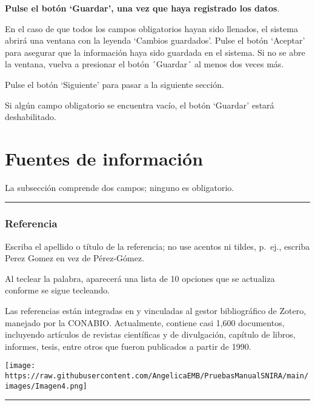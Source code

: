 \documentclass[
]{book}
\begin{document}
\textbf{Pulse el botón `Guardar', una vez que haya registrado los datos}.

En el caso de que todos los campos obligatorios hayan sido llenados, el sistema abrirá una ventana con la leyenda `Cambios guardados'. Pulse el botón `Aceptar' para asegurar que la información haya sido guardada en el sistema. Si no se abre la ventana, vuelva a presionar el botón ´Guardar´ al menos dos veces más.

Pulse el botón `Siguiente' para pasar a la siguiente sección.

Si algún campo obligatorio se encuentra vacío, el botón `Guardar' estará deshabilitado.

\hypertarget{fuentes-de-informaciuxf3n}{%
\chapter{Fuentes de información}\label{fuentes-de-informaciuxf3n}}

La subsección comprende dos campos; ninguno es obligatorio.

\begin{center}\rule{0.5\linewidth}{0.5pt}\end{center}

\hypertarget{referencia}{%
\subsection*{Referencia}\label{referencia}}

Escriba el apellido o título de la referencia; no use acentos ni tildes, p.~ej., escriba Perez Gomez en vez de Pérez-Gómez.

Al teclear la palabra, aparecerá una lista de 10 opciones que se actualiza conforme se sigue tecleando.

Las referencias están integradas en y vinculadas al gestor bibliográfico de Zotero, manejado por la CONABIO. Actualmente, contiene casi 1,600 documentos, incluyendo artículos de revistas científicas y de divulgación, capítulo de libros, informes, tesis, entre otros que fueron publicados a partir de 1990.

\texttt{[image: https://raw.githubusercontent.com/AngelicaEMB/PruebasManualSNIRA/main/images/Imagen4.png]}

\begin{center}\rule{0.5\linewidth}{0.5pt}\end{center}
\end{document}
